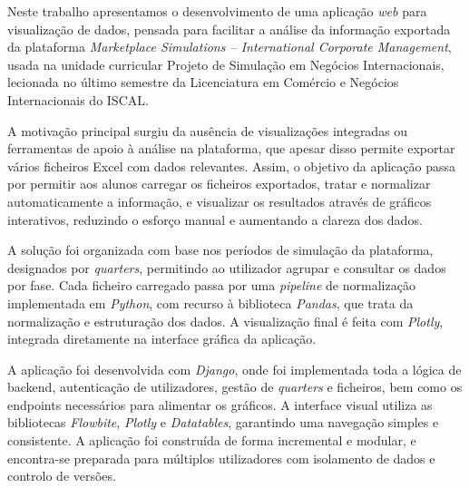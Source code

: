 




Neste trabalho apresentamos o desenvolvimento de uma aplicação \textit{web} para visualização de dados, pensada para facilitar a análise da informação exportada da plataforma \textit{Marketplace Simulations – International Corporate Management}, usada na unidade curricular Projeto de Simulação em Negócios Internacionais, lecionada no último semestre da Licenciatura em Comércio e Negócios Internacionais do ISCAL.

A motivação principal surgiu da ausência de visualizações integradas ou ferramentas de apoio à análise na plataforma, que apesar disso permite exportar vários ficheiros Excel com dados relevantes. Assim, o objetivo da aplicação passa por permitir aos alunos carregar os ficheiros exportados, tratar e normalizar automaticamente a informação, e visualizar os resultados através de gráficos interativos, reduzindo o esforço manual e aumentando a clareza dos dados.

A solução foi organizada com base nos períodos de simulação da plataforma, designados por \textit{quarters}, permitindo ao utilizador agrupar e consultar os dados por fase. Cada ficheiro carregado passa por uma \textit{pipeline} de normalização implementada em \textit{Python}, com recurso à biblioteca \textit{Pandas}, que trata da normalização e estruturação dos dados. A visualização final é feita com \textit{Plotly}, integrada diretamente na interface gráfica da aplicação.

A aplicação foi desenvolvida com \textit{Django}, onde foi implementada toda a lógica de backend, autenticação de utilizadores, gestão de \textit{quarters} e ficheiros, bem como os endpoints necessários para alimentar os gráficos. A interface visual utiliza as bibliotecas \textit{Flowbite}, \textit{Plotly} e \textit{Datatables}, garantindo uma navegação simples e consistente. A aplicação foi construída de forma incremental e modular, e encontra-se preparada para múltiplos utilizadores com isolamento de dados e controlo de versões.

